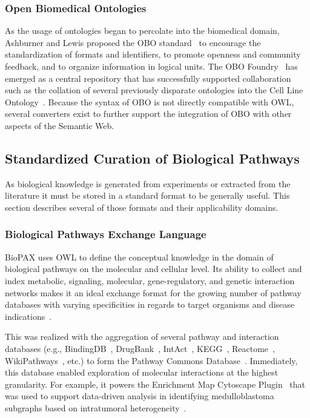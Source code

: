 \subsubsection{Open Biomedical Ontologies}

As the usage of ontologies began to percolate into the biomedical domain, Ashburner and Lewis proposed the \ac{OBO} standard~\cite{Ashburner2003} to encourage the standardization of formats and identifiers, to promote openness and community feedback, and to organize information in logical units.
The OBO Foundry~\cite{Smith2007} has emerged as a central repository that has successfully supported collaboration such as the collation of several previously disparate ontologies into the Cell Line Ontology~\cite{Sarntivijai2014}.
Because the syntax of \ac{OBO} is not directly compatible with \ac{OWL}, several converters exist to further support the integration of \ac{OBO} with other aspects of the Semantic Web.

\subsection{Standardized Curation of Biological Pathways}

As biological knowledge is generated from experiments or extracted from the literature it must be stored in a standard format to be generally useful.
This section describes several of those formats and their applicability domains.

\subsubsection{Biological Pathways Exchange Language}

\ac{BioPAX} uses \ac{OWL} to define the conceptual knowledge in the domain of biological pathways on the molecular and cellular level.
Its ability to collect and index metabolic, signaling, molecular, gene-regulatory, and genetic interaction networks makes it an ideal exchange format for the growing number of pathway databases with varying specificities in regards to target organisms and disease indications~\cite{Demir2010}.

This was realized with the aggregation of several pathway and interaction databases (e.g., BindingDB~\cite{Gilson2016}, DrugBank~\cite{Law2014}, IntAct~\cite{Orchard2014}, \ac{KEGG}~\cite{Kanehisa2017}, Reactome~\cite{Fabregat2016}, WikiPathways~\cite{Pico2008}, etc.) to form the Pathway Commons Database~\cite{Cerami2011}.
Immediately, this database enabled exploration of molecular interactions at the highest granularity.
For example, it powers the Enrichment Map Cytoscape Plugin~\cite{Merico2010} that was used to support data-driven analysis in identifying medulloblastoma subgraphs based on intratumoral heterogeneity~\cite{Cavalli2017}.


